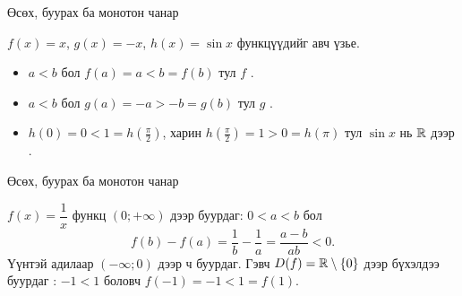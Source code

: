 \begin{frame}[allowframebreaks]{Өсөх, буурах ба монотон чанар}
\begin{example}
$f(x)=x$, $g(x)=-x$, $h(x)=\sin x$ функцүүдийг авч үзье.
\begin{itemize}
  \item $a<b$ бол $f(a)=a<b=f(b)$ тул $f$ .
  \item $a<b$ бол $g(a)=-a>-b=g(b)$ тул $g$ .
  \item $h(0)=0<1=h\!\left(\tfrac{\pi}{2}\right)$, харин $h\!\left(\tfrac{\pi}{2}\right)=1>0=h(\pi)$
        тул $\sin x$ нь $\mathbb{R}$ дээр .
\end{itemize}
\begin{center}
\begin{fitbox}\end{fitbox}
\end{center}
\end{example}
\end{frame}

\begin{frame}[allowframebreaks]{Өсөх, буурах ба монотон чанар}
\begin{example}[Анхаар!]
$f(x)=\dfrac1x$ функц $(0;+\infty)$ дээр буурдаг: $0<a<b$ бол
\[
f(b)-f(a)=\frac1b-\frac1a=\frac{a-b}{ab}<0.
\]
Үүнтэй адилаар $(-\infty;0)$ дээр ч буурдаг. Гэвч $D(f)=\mathbb{R}\setminus\{0\}$ дээр бүхэлдээ
буурдаг : $-1<1$ боловч $f(-1)=-1<1=f(1)$.
\end{example}
\end{frame}

